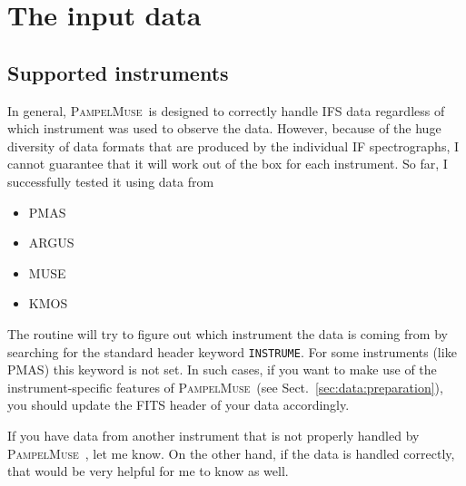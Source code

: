 \documentclass[a4paper,10pt]{article}
\newcommand{\pmparameter}[5]{\begin{center}\framebox{\begin{tabularx}{.95\linewidth}{c c c X} \textbf{#1}|\textbf{#2} & type=\textit{#3} & default=#4 & \footnotesize{\textcolor{light-gray}{#5}}\end{tabularx}}\end{center}}
\newcommand{\pampelmuse}{\textsc{PampelMuse}\ }
\begin{document}
\section{The input data}
\label{sec:data}

\subsection{Supported instruments}

In general, \pampelmuse is designed to correctly handle IFS data regardless of which instrument was used to observe the data. However, because of the huge diversity of data formats that are produced by the individual IF spectrographs, I cannot guarantee that it will work out of the box for each instrument. So far, I successfully tested it using data from
\begin{itemize}
 \item PMAS \citep{2005PASP..117..620R}
 \item ARGUS \citep{2002Msngr.110....1P}
 \item MUSE \citep{2010SPIE.7735E..08B}
 \item KMOS \citep{2004SPIE.5492.1179S}
\end{itemize}

The routine will try to figure out which instrument the data is coming from by searching for the standard header keyword \texttt{INSTRUME}. For some instruments (like PMAS) this keyword is not set. In such cases, if you want to make use of the instrument-specific features of \pampelmuse (see Sect.~\ref{sec:data:preparation}), you should update the FITS header of your data accordingly.


If you have data from another instrument that is not properly handled by \pampelmuse, let me know. On the other hand, if the data is handled correctly, that would be very helpful for me to know as well.
\end{document}
